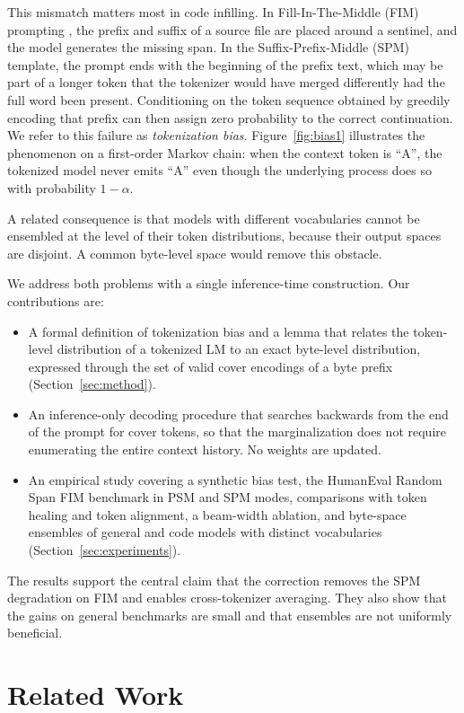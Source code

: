\documentclass{article} %
\begin{document}
This mismatch matters most in code infilling. In Fill-In-The-Middle (FIM) prompting \citep{bavarian2022fim}, the prefix and suffix of a source file are placed around a sentinel, and the model generates the missing span. In the Suffix-Prefix-Middle (SPM) template, the prompt ends with the beginning of the prefix text, which may be part of a longer token that the tokenizer would have merged differently had the full word been present. Conditioning on the token sequence obtained by greedily encoding that prefix can then assign zero probability to the correct continuation. We refer to this failure as \emph{tokenization bias}. Figure~\ref{fig:bias1} illustrates the phenomenon on a first-order Markov chain: when the context token is ``A'', the tokenized model never emits ``A'' even though the underlying process does so with probability $1-\alpha$.

A related consequence is that models with different vocabularies cannot be ensembled at the level of their token distributions, because their output spaces are disjoint. A common byte-level space would remove this obstacle.

We address both problems with a single inference-time construction. Our contributions are:
\begin{itemize}
    \item A formal definition of tokenization bias and a lemma that relates the token-level distribution of a tokenized LM to an exact byte-level distribution, expressed through the set of valid cover encodings of a byte prefix (Section~\ref{sec:method}).
    \item An inference-only decoding procedure that searches backwards from the end of the prompt for cover tokens, so that the marginalization does not require enumerating the entire context history. No weights are updated.
    \item An empirical study covering a synthetic bias test, the HumanEval Random Span FIM benchmark in PSM and SPM modes, comparisons with token healing and token alignment, a beam-width ablation, and byte-space ensembles of general and code models with distinct vocabularies (Section~\ref{sec:experiments}).
\end{itemize}
The results support the central claim that the correction removes the SPM degradation on FIM and enables cross-tokenizer averaging. They also show that the gains on general benchmarks are small and that ensembles are not uniformly beneficial.

\section{Related Work}
\label{sec:related_work}
\end{document}
